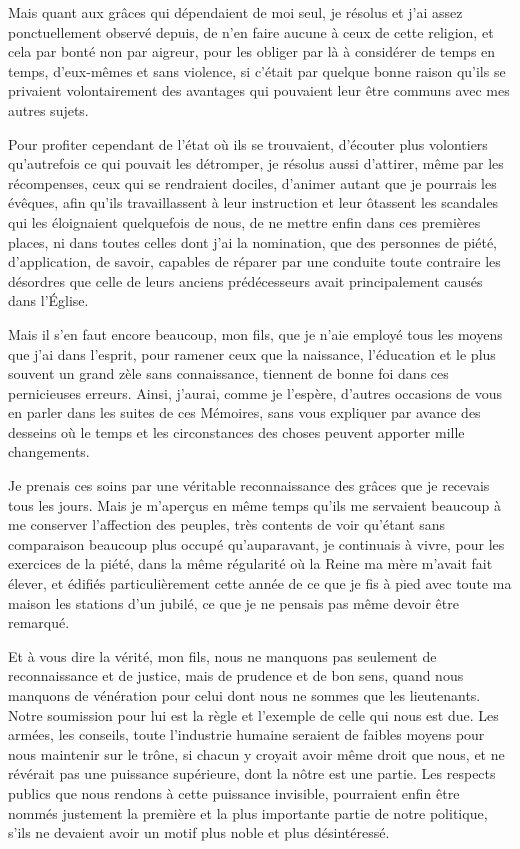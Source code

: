 \documentclass[french,twoside]{book} %
\begin{document}
Mais quant aux grâces qui dépendaient de moi seul, je résolus et j’ai assez ponctuellement observé depuis, de n’en faire aucune à ceux de cette religion, et cela par bonté non par aigreur, pour les obliger par là à considérer de temps en temps, d’eux-mêmes et sans violence, si c’était par quelque bonne raison qu’ils se privaient volontairement des avantages qui pouvaient leur être communs avec mes autres sujets.\par
Pour profiter cependant de l’état où ils se trouvaient, d’écouter plus volontiers qu’autrefois ce qui pouvait les détromper, je résolus aussi d’attirer, même par les récompenses, ceux qui se rendraient dociles, d’animer autant que je pourrais les évêques, afin qu’ils travaillassent à leur instruction et leur ôtassent les scandales qui les éloignaient quelquefois de nous, de ne mettre enfin dans ces premières places, ni dans toutes celles dont j’ai la nomination, que des personnes de piété, d’application, de savoir, capables de réparer par une conduite toute contraire les désordres que celle de leurs anciens prédécesseurs avait principalement causés dans l’Église.\par
Mais il s’en faut encore beaucoup, mon fils, que je n’aie employé tous les moyens que j’ai dans l’esprit, pour ramener ceux que la naissance, l’éducation et le plus souvent un grand zèle sans connaissance, tiennent de bonne foi dans ces pernicieuses erreurs. Ainsi, j’aurai, comme je l’espère, d’autres occasions de vous en parler dans les suites de ces Mémoires, sans vous expliquer par avance des desseins où le temps et les circonstances des choses peuvent apporter mille changements.\par
Je prenais ces soins par une véritable reconnaissance des grâces que je recevais tous les jours. Mais je m’aperçus en même temps qu’ils me servaient beaucoup à me conserver l’affection des peuples, très contents de voir qu’étant sans comparaison beaucoup plus occupé qu’auparavant, je continuais à vivre, pour les exercices de la piété, dans la même régularité où la Reine ma mère m’avait fait élever, et édifiés particulièrement cette année de ce que je fis à pied avec toute ma maison les stations d’un jubilé, ce que je ne pensais pas même devoir être remarqué.\par
Et à vous dire la vérité, mon fils, nous ne manquons pas seulement de reconnaissance et de justice, mais de prudence et de bon sens, quand nous manquons de vénération pour celui dont nous ne sommes que les lieutenants. Notre soumission pour lui est la règle et l’exemple de celle qui nous est due. Les armées, les conseils, toute l’industrie humaine seraient de faibles moyens pour nous maintenir sur le trône, si chacun y croyait avoir même droit que nous, et ne révérait pas une puissance supérieure, dont la nôtre est une partie. Les respects publics que nous rendons à cette puissance invisible, pourraient enfin être nommés justement la première et la plus importante partie de notre politique, s’ils ne devaient avoir un motif plus noble et plus désintéressé.\par
\end{document}
